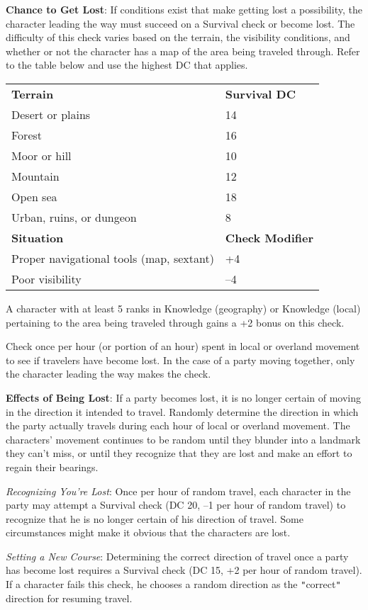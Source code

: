 \textbf{Chance to Get Lost}: If conditions exist that make getting lost a possibility, the character leading the way must succeed on a Survival check or become lost. The difficulty of this check varies based on the terrain, the visibility conditions, and whether or not the character has a map of the area being traveled through. Refer to the table below and use the highest DC that applies.

\begin{tabular}{ll}
\textbf{Terrain} & \textbf{Survival DC} \\
Desert or plains & 14\\
Forest & 16\\
Moor or hill & 10\\
Mountain & 12\\
Open sea & 18\\
Urban, ruins, or dungeon & 8\\
 \textbf{Situation} & \textbf{Check Modifier}\\
Proper navigational tools (map, sextant) & +4\\
Poor visibility & --4\\
\end{tabular}

				
A character with at least 5 ranks in Knowledge (geography) or Knowledge (local) pertaining to the area being traveled through gains a +2 bonus on this check.
				
Check once per hour (or portion of an hour) spent in local or overland movement to see if travelers have become lost. In the case of a party moving together, only the character leading the way makes the check.
				
\textbf{Effects of Being Lost}: If a party becomes lost, it is no longer certain of moving in the direction it intended to travel. Randomly determine the direction in which the party actually travels during each hour of local or overland movement. The characters' movement continues to be random until they blunder into a landmark they can't miss, or until they recognize that they are lost and make an effort to regain their bearings.
				
\textit{Recognizing You're Lost}: Once per hour of random travel, each character in the party may attempt a Survival check (DC 20, --1 per hour of random travel) to recognize that he is no longer certain of his direction of travel. Some circumstances might make it obvious that the characters are lost.
				
\textit{Setting a New Course}: Determining the correct direction of travel once a party has become lost requires a Survival check (DC 15, +2 per hour of random travel). If a character fails this check, he chooses a random direction as the \texttt{{}"{}}correct\texttt{{}"{}} direction for resuming travel.
				
